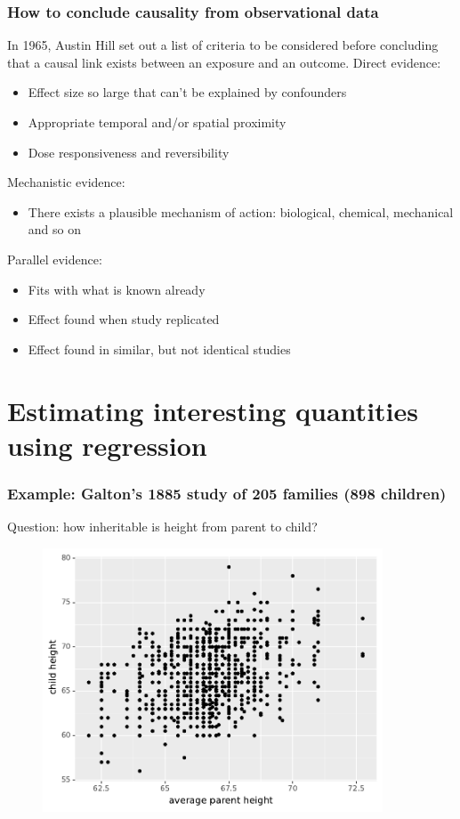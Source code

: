 \documentclass[handout]{beamer}
\begin{document}
\begin{frame}
	\frametitle{How to conclude causality from observational data}
	In 1965, Austin Hill set out a list of criteria to be considered before concluding that a causal link exists between an exposure and an outcome.
	Direct evidence:
	\begin{itemize}
		\item Effect size so large that can't be explained by confounders
		\item Appropriate temporal and/or spatial proximity
		\item Dose responsiveness and reversibility
	\end{itemize}
	
	Mechanistic evidence:
	\begin{itemize}
		\item There exists a plausible mechanism of action: biological, chemical, mechanical and so on
	\end{itemize}
	
	Parallel evidence:
	\begin{itemize}
		\item Fits with what is known already
		\item Effect found when study replicated
		\item Effect found in similar, but not identical studies
	\end{itemize}
	
\end{frame}


\section{Estimating interesting quantities using regression}
\frame{\tableofcontents[currentsection]}

\begin{frame}
	\frametitle{Example: Galton's 1885 study of 205 families (898 children)}
	
	Question: how inheritable is height from parent to child?
	
		\begin{figure}[ht]
			\centerline{\includegraphics[width=0.9\textwidth]{../figures/galton_raw.pdf}}
		\end{figure}
	
\end{frame}
\end{document}
